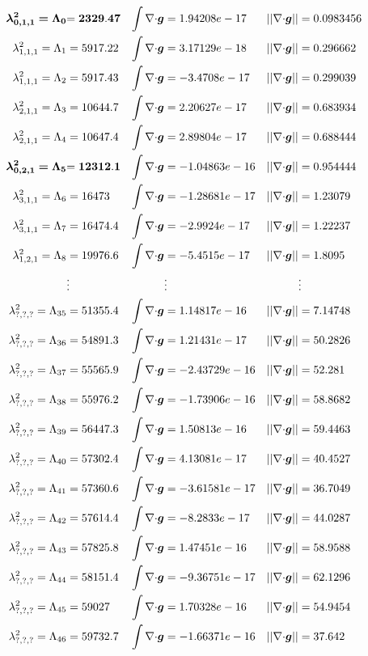 \begin{align*}
\bm{\lambda^2_{0,1,1}=\Lambda_0} &\bf{= 2329.47}	&\int{\nabla\cdot}\bm{g} &= 1.94208e-17	&||{\nabla\cdot}\bm{g}|| &= 0.0983456\\
\lambda^2_{1,1,1}=\Lambda_1 &= 5917.22	&\int{\nabla\cdot}\bm{g} &= 3.17129e-18	&||{\nabla\cdot}\bm{g}|| &= 0.296662\\
\lambda^2_{1,1,1}=\Lambda_2 &= 5917.43	&\int{\nabla\cdot}\bm{g} &= -3.4708e-17	&||{\nabla\cdot}\bm{g}|| &= 0.299039\\
\lambda^2_{2,1,1}=\Lambda_3 &= 10644.7	&\int{\nabla\cdot}\bm{g} &= 2.20627e-17	&||{\nabla\cdot}\bm{g}|| &= 0.683934\\
\lambda^2_{2,1,1}=\Lambda_4 &= 10647.4	&\int{\nabla\cdot}\bm{g} &= 2.89804e-17	&||{\nabla\cdot}\bm{g}|| &= 0.688444\\
\bm{\lambda^2_{0,2,1}=\Lambda_5} &\bf{= 12312.1}	&\int{\nabla\cdot}\bm{g} &= -1.04863e-16	&||{\nabla\cdot}\bm{g}|| &= 0.954444\\
\lambda^2_{3,1,1}=\Lambda_6 &= 16473	&\int{\nabla\cdot}\bm{g} &= -1.28681e-17	&||{\nabla\cdot}\bm{g}|| &= 1.23079\\
\lambda^2_{3,1,1}=\Lambda_7 &= 16474.4	&\int{\nabla\cdot}\bm{g} &= -2.9924e-17	&||{\nabla\cdot}\bm{g}|| &= 1.22237\\
\lambda^2_{1,2,1}=\Lambda_8 &= 19976.6	&\int{\nabla\cdot}\bm{g} &= -5.4515e-17	&||{\nabla\cdot}\bm{g}|| &= 1.8095\\
&\vdots & &\vdots & &\vdots\\
\lambda^2_{?,?,?}=\Lambda_{35} &= 51355.4	&\int{\nabla\cdot}\bm{g} &= 1.14817e-16	&||{\nabla\cdot}\bm{g}|| &= 7.14748\\
\lambda^2_{?,?,?}=\Lambda_{36} &= 54891.3	&\int{\nabla\cdot}\bm{g} &= 1.21431e-17	&||{\nabla\cdot}\bm{g}|| &= 50.2826\\
\lambda^2_{?,?,?}=\Lambda_{37} &= 55565.9	&\int{\nabla\cdot}\bm{g} &= -2.43729e-16	&||{\nabla\cdot}\bm{g}|| &= 52.281\\
\lambda^2_{?,?,?}=\Lambda_{38} &= 55976.2	&\int{\nabla\cdot}\bm{g} &= -1.73906e-16	&||{\nabla\cdot}\bm{g}|| &= 58.8682\\
\lambda^2_{?,?,?}=\Lambda_{39} &= 56447.3	&\int{\nabla\cdot}\bm{g} &= 1.50813e-16	&||{\nabla\cdot}\bm{g}|| &= 59.4463\\
\lambda^2_{?,?,?}=\Lambda_{40} &= 57302.4	&\int{\nabla\cdot}\bm{g} &= 4.13081e-17	&||{\nabla\cdot}\bm{g}|| &= 40.4527\\
\lambda^2_{?,?,?}=\Lambda_{41} &= 57360.6	&\int{\nabla\cdot}\bm{g} &= -3.61581e-17	&||{\nabla\cdot}\bm{g}|| &= 36.7049\\
\lambda^2_{?,?,?}=\Lambda_{42} &= 57614.4	&\int{\nabla\cdot}\bm{g} &= -8.2833e-17	&||{\nabla\cdot}\bm{g}|| &= 44.0287\\
\lambda^2_{?,?,?}=\Lambda_{43} &= 57825.8	&\int{\nabla\cdot}\bm{g} &= 1.47451e-16	&||{\nabla\cdot}\bm{g}|| &= 58.9588\\
\lambda^2_{?,?,?}=\Lambda_{44} &= 58151.4	&\int{\nabla\cdot}\bm{g} &= -9.36751e-17	&||{\nabla\cdot}\bm{g}|| &= 62.1296\\
\lambda^2_{?,?,?}=\Lambda_{45} &= 59027	&\int{\nabla\cdot}\bm{g} &= 1.70328e-16	&||{\nabla\cdot}\bm{g}|| &= 54.9454\\
\lambda^2_{?,?,?}=\Lambda_{46} &= 59732.7	&\int{\nabla\cdot}\bm{g} &= -1.66371e-16	&||{\nabla\cdot}\bm{g}|| &= 37.642
\end{align*}

